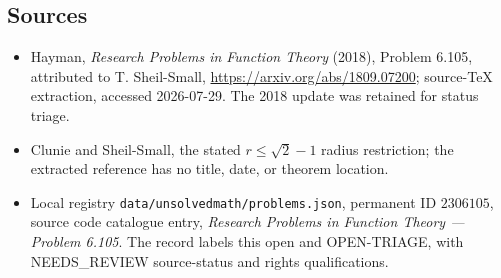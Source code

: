 \documentclass[11pt]{article}
\begin{document}
\subsection{Sources}
\begin{itemize}
\item Hayman, \emph{Research Problems in Function Theory} (2018), Problem 6.105, attributed to T. Sheil-Small, \url{https://arxiv.org/abs/1809.07200}; source-TeX extraction, accessed 2026-07-29. The 2018 update was retained for status triage.
\item Clunie and Sheil-Small, the stated $r\leq\sqrt2-1$ radius restriction; the extracted reference has no title, date, or theorem location.
\item Local registry \texttt{data/unsolvedmath/problems.json}, permanent ID $2306105$, source code catalogue entry, \emph{Research Problems in Function Theory --- Problem 6.105}. The record labels this open and OPEN-TRIAGE, with NEEDS\_REVIEW source-status and rights qualifications.
\end{itemize}
\end{document}
